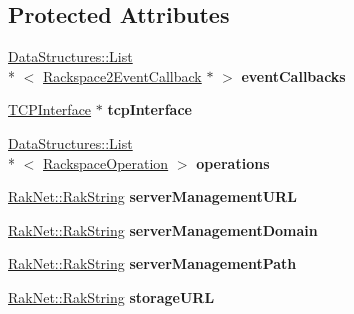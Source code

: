\subsection*{Protected Attributes}
\begin{DoxyCompactItemize}
\item 
\hypertarget{class_rak_net_1_1_rackspace_af365dda4165dca6336e11abd04e38606}{\hyperlink{class_data_structures_1_1_list}{Data\-Structures\-::\-List}\\*
$<$ \hyperlink{class_rak_net_1_1_rackspace2_event_callback}{Rackspace2\-Event\-Callback} $\ast$ $>$ {\bfseries event\-Callbacks}}\label{class_rak_net_1_1_rackspace_af365dda4165dca6336e11abd04e38606}

\item 
\hypertarget{class_rak_net_1_1_rackspace_aba506c461e7411abff7944c86d1feca4}{\hyperlink{class_rak_net_1_1_t_c_p_interface}{T\-C\-P\-Interface} $\ast$ {\bfseries tcp\-Interface}}\label{class_rak_net_1_1_rackspace_aba506c461e7411abff7944c86d1feca4}

\item 
\hypertarget{class_rak_net_1_1_rackspace_afc4b2040d142a8c944abe8c6997a5a00}{\hyperlink{class_data_structures_1_1_list}{Data\-Structures\-::\-List}\\*
$<$ \hyperlink{struct_rak_net_1_1_rackspace_1_1_rackspace_operation}{Rackspace\-Operation} $>$ {\bfseries operations}}\label{class_rak_net_1_1_rackspace_afc4b2040d142a8c944abe8c6997a5a00}

\item 
\hypertarget{class_rak_net_1_1_rackspace_ae65638afd7bb528063fe969029c4fb5b}{\hyperlink{class_rak_net_1_1_rak_string}{Rak\-Net\-::\-Rak\-String} {\bfseries server\-Management\-U\-R\-L}}\label{class_rak_net_1_1_rackspace_ae65638afd7bb528063fe969029c4fb5b}

\item 
\hypertarget{class_rak_net_1_1_rackspace_aced6f50865bfba179f5dbaf1b968bbfc}{\hyperlink{class_rak_net_1_1_rak_string}{Rak\-Net\-::\-Rak\-String} {\bfseries server\-Management\-Domain}}\label{class_rak_net_1_1_rackspace_aced6f50865bfba179f5dbaf1b968bbfc}

\item 
\hypertarget{class_rak_net_1_1_rackspace_adf020195f6b04c0422a8f5ca05948b71}{\hyperlink{class_rak_net_1_1_rak_string}{Rak\-Net\-::\-Rak\-String} {\bfseries server\-Management\-Path}}\label{class_rak_net_1_1_rackspace_adf020195f6b04c0422a8f5ca05948b71}

\item 
\hypertarget{class_rak_net_1_1_rackspace_a06b56631b1ba183ab242e124a93dd9b2}{\hyperlink{class_rak_net_1_1_rak_string}{Rak\-Net\-::\-Rak\-String} {\bfseries storage\-U\-R\-L}}\label{class_rak_net_1_1_rackspace_a06b56631b1ba183ab242e124a93dd9b2}


\end{DoxyCompactItemize}
